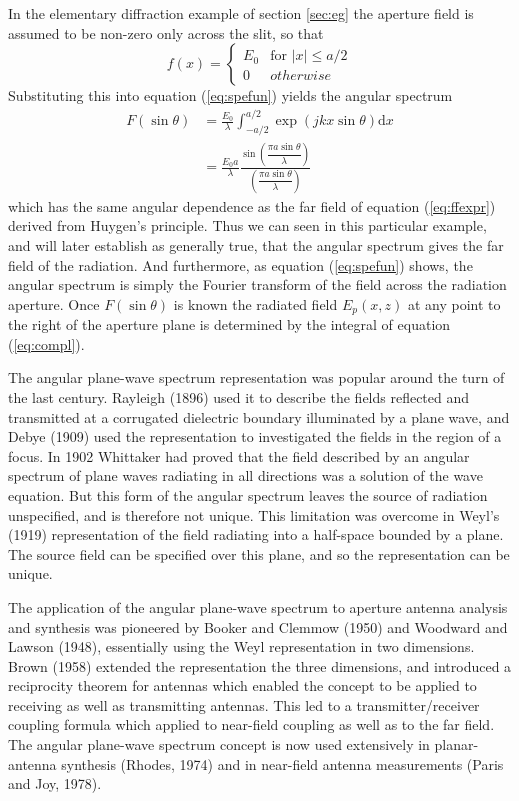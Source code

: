 In the elementary diffraction example of section \ref{sec:eg} the aperture field is assumed to be non-zero only across the slit, so that
\begin{equation}
f(x)= \left\{
\begin{array}{ll}
E_0 & \text{for }|x| \leqslant a/2 \\
0 & otherwise
\end{array}
\right.
\end{equation}
Substituting this into equation (\ref{eq:spefun}) yields the angular spectrum
\begin{equation}
\begin{aligned}
F(\sin\theta)&=\frac{E_0}{\lambda}\int_{-a/2}^{a/2}\exp(jkx\sin\theta)\mathrm{d}x\\
&=\frac{E_0a}{\lambda}\frac{\sin(\dfrac{\pi a\sin\theta}{\lambda})}{(\dfrac{\pi a\sin\theta}{\lambda})}
\end{aligned}
\end{equation}
which has the same angular dependence as the far field of equation (\ref{eq:ffexpr}) derived from Huygen's principle. Thus we can seen in this particular example, and will later establish as generally true, that the angular spectrum gives the far field of the radiation. And furthermore, as equation (\ref{eq:spefun}) shows, the angular spectrum is simply the Fourier transform of the field across the radiation aperture. Once $F(\sin\theta)$ is known the radiated field $E_p(x,z)$ at any point to the right of the aperture plane is determined by the integral of equation (\ref{eq:compl}).

The angular plane-wave spectrum representation was popular around the turn of the last century. Rayleigh (1896) used it to describe the fields reflected and transmitted at a corrugated dielectric boundary illuminated by a plane wave, and Debye (1909) used the representation to investigated the fields in the region of a focus. In 1902 Whittaker had proved that the field described by an angular spectrum of plane waves radiating in all directions was a solution of the wave equation. But this form of the angular spectrum leaves the source of radiation unspecified, and is therefore not unique. This limitation was overcome in Weyl's (1919) representation of the field radiating into a half-space bounded by a plane. The source field can be specified over this plane, and so the representation can be unique.

The application of the angular plane-wave spectrum to aperture antenna analysis and synthesis was pioneered by Booker and Clemmow (1950) and Woodward and Lawson (1948), essentially using the Weyl representation in two dimensions. Brown (1958) extended the representation the three dimensions, and introduced a reciprocity theorem for antennas which enabled the concept to be applied to receiving as well as transmitting antennas. This led to a transmitter/receiver coupling formula which applied to near-field coupling as well as to the far field. The angular plane-wave spectrum concept is now used extensively in planar-antenna synthesis (Rhodes, 1974) and in near-field antenna measurements (Paris and Joy, 1978).

